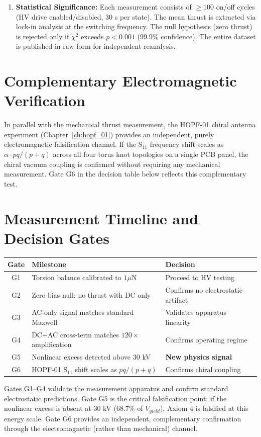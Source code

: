 \begin{enumerate}
    \item \textbf{Statistical Significance:} Each measurement consists of $\geq 100$ on/off cycles (HV drive enabled/disabled, 30 s per state). The mean thrust is extracted via lock-in analysis at the switching frequency. The null hypothesis (zero thrust) is rejected only if $\chi^2$ exceeds $p < 0.001$ (99.9\% confidence). The entire dataset is published in raw form for independent reanalysis.
\end{enumerate}

\section{Complementary Electromagnetic Verification}

In parallel with the mechanical thrust measurement, the HOPF-01 chiral antenna experiment (Chapter~\ref{ch:hopf_01}) provides an independent, purely electromagnetic falsification channel. If the S$_{11}$ frequency shift scales as $\alpha \cdot pq/(p+q)$ across all four torus knot topologies on a single PCB panel, the chiral vacuum coupling is confirmed without requiring any mechanical measurement. Gate G6 in the decision table below reflects this complementary test.

\section{Measurement Timeline and Decision Gates}

\begin{center}
\begin{tabular}{|c|l|l|}
\hline
Gate & Milestone & Decision \\ \hline
G1 & Torsion balance calibrated to $1 \mu$N & Proceed to HV testing \\
G2 & Zero-bias null: no thrust with DC only & Confirms no electrostatic artifact \\
G3 & AC-only signal matches standard Maxwell & Validates apparatus linearity \\
G4 & DC+AC cross-term matches $120\times$ amplification & Confirms operating regime \\
G5 & Nonlinear excess detected above $30$ kV & \textbf{New physics signal} \\
G6 & HOPF-01 S$_{11}$ shift scales as $pq/(p+q)$ & Confirms chiral coupling \\ \hline
\end{tabular}
\end{center}

Gates G1--G4 validate the measurement apparatus and confirm standard electrostatic predictions. Gate G5 is the critical falsification point: if the nonlinear excess is absent at $30$ kV ($68.7\%$ of $V_{yield}$), Axiom 4 is falsified at this energy scale. Gate G6 provides an independent, complementary confirmation through the electromagnetic (rather than mechanical) channel.
